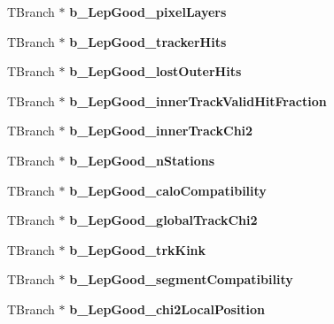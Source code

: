 \begin{DoxyCompactItemize}
\item 
\hypertarget{classMiniTree_aa97307076ea7381c181536b42c5f5262}{}\label{classMiniTree_aa97307076ea7381c181536b42c5f5262} 
T\+Branch $\ast$ {\bfseries b\+\_\+\+Lep\+Good\+\_\+pixel\+Layers}
\item 
\hypertarget{classMiniTree_a0f61d84eeb24455820ad40d8b7ff30b5}{}\label{classMiniTree_a0f61d84eeb24455820ad40d8b7ff30b5} 
T\+Branch $\ast$ {\bfseries b\+\_\+\+Lep\+Good\+\_\+tracker\+Hits}
\item 
\hypertarget{classMiniTree_a664fa7acf2e55ab2e566e0dac070eaf5}{}\label{classMiniTree_a664fa7acf2e55ab2e566e0dac070eaf5} 
T\+Branch $\ast$ {\bfseries b\+\_\+\+Lep\+Good\+\_\+lost\+Outer\+Hits}
\item 
\hypertarget{classMiniTree_a77bb42e8d6d820d73881254241da41ac}{}\label{classMiniTree_a77bb42e8d6d820d73881254241da41ac} 
T\+Branch $\ast$ {\bfseries b\+\_\+\+Lep\+Good\+\_\+inner\+Track\+Valid\+Hit\+Fraction}
\item 
\hypertarget{classMiniTree_a551c47369a102eca2cc3404c3a124cc3}{}\label{classMiniTree_a551c47369a102eca2cc3404c3a124cc3} 
T\+Branch $\ast$ {\bfseries b\+\_\+\+Lep\+Good\+\_\+inner\+Track\+Chi2}
\item 
\hypertarget{classMiniTree_a1917296c9aaed3876fe5be7d7a694124}{}\label{classMiniTree_a1917296c9aaed3876fe5be7d7a694124} 
T\+Branch $\ast$ {\bfseries b\+\_\+\+Lep\+Good\+\_\+n\+Stations}
\item 
\hypertarget{classMiniTree_a93204d66fc72ef6b3e74e8937c44d88f}{}\label{classMiniTree_a93204d66fc72ef6b3e74e8937c44d88f} 
T\+Branch $\ast$ {\bfseries b\+\_\+\+Lep\+Good\+\_\+calo\+Compatibility}
\item 
\hypertarget{classMiniTree_a9e93a6e83e0e81e322f278e35e8cc2a3}{}\label{classMiniTree_a9e93a6e83e0e81e322f278e35e8cc2a3} 
T\+Branch $\ast$ {\bfseries b\+\_\+\+Lep\+Good\+\_\+global\+Track\+Chi2}
\item 
\hypertarget{classMiniTree_a9422031de74fbbdc648cd09be80e2b9c}{}\label{classMiniTree_a9422031de74fbbdc648cd09be80e2b9c} 
T\+Branch $\ast$ {\bfseries b\+\_\+\+Lep\+Good\+\_\+trk\+Kink}
\item 
\hypertarget{classMiniTree_af7b9cb670674a1a679534b7ab60789a3}{}\label{classMiniTree_af7b9cb670674a1a679534b7ab60789a3} 
T\+Branch $\ast$ {\bfseries b\+\_\+\+Lep\+Good\+\_\+segment\+Compatibility}
\item 
\hypertarget{classMiniTree_a7661f390b2cfe46d7ee254090f4b2732}{}\label{classMiniTree_a7661f390b2cfe46d7ee254090f4b2732} 
T\+Branch $\ast$ {\bfseries b\+\_\+\+Lep\+Good\+\_\+chi2\+Local\+Position}

\end{DoxyCompactItemize}
